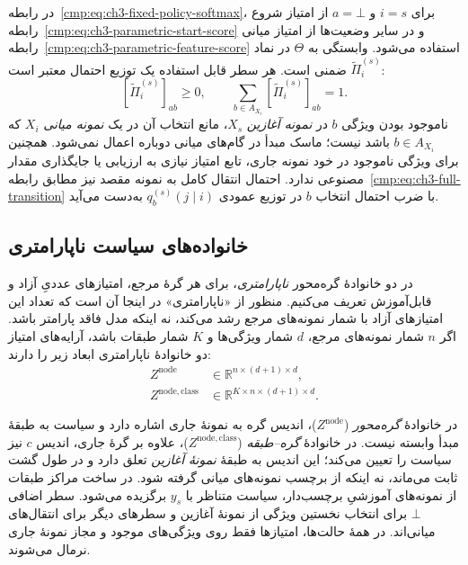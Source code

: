 در رابطه~\eqref{cmp:eq:ch3-fixed-policy-softmax}، برای $i=s$ و $a=\bot$ از امتیاز شروع
رابطه~\eqref{cmp:eq:ch3-parametric-start-score} و در سایر وضعیت‌ها
از امتیاز میانی رابطه~\eqref{cmp:eq:ch3-parametric-feature-score}
استفاده می‌شود. وابستگی به $\Theta$ در نماد $\widetilde\Pi_i^{(s)}$
ضمنی است. هر سطر قابل استفاده یک توزیع احتمال معتبر است:
\begin{equation}\label{cmp:eq:ch3-policy-stochastic}
[\widetilde\Pi_i^{(s)}]_{ab}\ge0,\qquad
\sum_{b\in A_{X_i}}[\widetilde\Pi_i^{(s)}]_{ab}=1.
\end{equation}
ناموجود بودن ویژگی $b$ در \emph{نمونه آغازین} $X_s$، مانع
انتخاب آن در یک \emph{نمونه میانی} $X_i$ که $b\in A_{X_i}$
باشد نیست؛ ماسک مبدأ در گام‌های میانی دوباره اعمال نمی‌شود.
همچنین برای ویژگی ناموجود در خود نمونه جاری، تابع امتیاز نیازی
به ارزیابی یا جایگذاری مقدار مصنوعی ندارد. احتمال انتقال کامل
به نمونه مقصد نیز مطابق رابطه~\eqref{cmp:eq:ch3-full-transition}
با ضرب احتمال انتخاب $b$ در توزیع عمودی $q_b^{(s)}(j\mid i)$
به‌دست می‌آید.

\subsection{خانواده‌های سیاست ناپارامتری}
\label{cmp:subsec:ch3-node-policy-families}
در دو خانوادهٔ گره‌محور \emph{ناپارامتری}،
برای هر گرهٔ مرجع، امتیازهای عددیِ آزاد و قابل‌آموزش تعریف می‌کنیم.
منظور از «ناپارامتری» در اینجا آن است که تعداد این امتیازهای آزاد
با شمار نمونه‌های مرجع رشد می‌کند، نه اینکه مدل فاقد پارامتر باشد.
اگر $n$ شمار نمونه‌های مرجع، $d$ شمار ویژگی‌ها و $K$ شمار طبقات باشد،
آرایه‌های امتیاز دو خانوادهٔ ناپارامتری ابعاد زیر را دارند:
\begin{equation}\label{cmp:eq:ch3-policy-family-shapes}
\begin{aligned}
Z^{\mathrm{node}}&\in\mathbb R^{n\times(d+1)\times d},\\
Z^{\mathrm{node,class}}&\in\mathbb R^{K\times n\times(d+1)\times d}.
\end{aligned}
\end{equation}

در خانوادهٔ \emph{گره‌محور} ($Z^{\mathrm{node}}$)، اندیس گره
به نمونهٔ جاری اشاره دارد و سیاست به طبقهٔ مبدأ وابسته نیست.
در خانوادهٔ \emph{گره--طبقه} ($Z^{\mathrm{node,class}}$)،
علاوه بر گرهٔ جاری، اندیس $c$ نیز سیاست را تعیین می‌کند؛
این اندیس به طبقهٔ \emph{نمونهٔ آغازین} تعلق دارد و در طول
گشت ثابت می‌ماند، نه اینکه از برچسب نمونه‌های میانی گرفته شود.
در ساخت مراکز طبقات از نمونه‌های آموزشیِ برچسب‌دار،
سیاست متناظر با $y_s$ برگزیده می‌شود.
سطر اضافی $\bot$ برای انتخاب نخستین ویژگی از نمونهٔ آغازین
و سطرهای دیگر برای انتقال‌های میانی‌اند. در همهٔ حالت‌ها،
امتیازها فقط روی ویژگی‌های موجود و مجاز نمونهٔ جاری نرمال می‌شوند.

